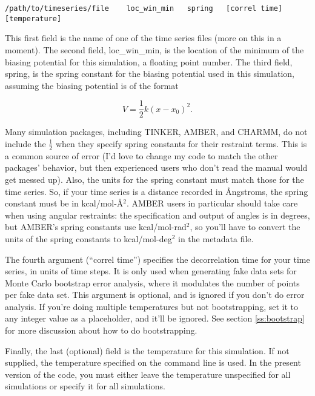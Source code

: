 \documentclass[12pt]{article}
\begin{document}
\begin{footnotesize}
\begin{verbatim}
/path/to/timeseries/file    loc_win_min   spring   [correl time] [temperature]
\end{verbatim}
\end{footnotesize}

This first field is the name of one of the time series files (more on this
in a moment).  The second field, loc\_win\_min, is the location of the
minimum of the biasing potential for this simulation, a floating point
number.  The third field, spring, is the spring constant for the biasing
potential used in this simulation, assuming the biasing potential is of the
format

\begin{equation}
V = \frac{1}{2} k (x-x_0)^2.
\end{equation}

Many simulation packages, including TINKER, AMBER, and CHARMM, do not include
the $\frac{1}{2}$ when they specify spring constants for their restraint terms.
This is a common source of error (I'd love to change my code to match the other
packages' behavior, but then experienced users who don't read the manual would
get messed up).  Also, the units for the spring constant must match those for
the time series.  So, if your time series is a distance recorded in
{\AA}ngstroms, the spring constant must be in kcal/mol-{\AA}$^2$.  AMBER users
in particular should take care when using angular restraints: the specification
and output of angles is in degrees, but AMBER's spring constants use
kcal/mol-rad$^2$, so you'll have to convert the units of the spring constants to kcal/mol-deg$^2$ in the metadata file.

The fourth argument (``correl time'') specifies the decorrelation time for
your time series, in units of time steps.  It is only used when generating
fake data sets for Monte Carlo bootstrap error analysis, where it modulates
the number of points per fake data set.  This argument is optional, and is
ignored if you don't do error analysis.  If you're doing multiple
temperatures but not bootstrapping, set it to any integer value as a
placeholder, and it'll be ignored.  See section \ref{ss:bootstrap} for more
discussion about how to do bootstrapping.

Finally, the last (optional) field is the temperature for this simulation.  If
not supplied, the temperature specified on the command line is used.  In
the present version of the code, you must either leave the temperature
unspecified for all simulations or specify it for all simulations.
\end{document}
